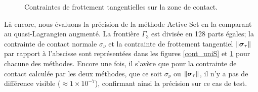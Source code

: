 \begin{figure}[ht!]
	\begin{center}
	\end{center}
	\caption{Contraintes de frottement tangentielles sur la zone de contact.}
	\label{cont_frotS}
\end{figure}
Là encore, nous évaluons la précision de la méthode Active Set en la comparant au quasi-Lagrangien augmenté. La frontière $\Gamma_3$ est divisée en 128 parts égales; la contrainte de contact normale $\sigma_{\nu}$ et la contrainte de frottement tangentiel $\|\mbox{\boldmath{$\sigma$}}_{\tau}\|$ par rapport à l'abscisse sont représentées dans les figures \ref{cont_uniS} et \ref{cont_frotS} pour chacune des méthodes. Encore une fois, il s'avère que pour la contrainte de contact calculée par les deux méthodes, que ce soit $\sigma_{\nu}$ ou $\|\mbox{\boldmath{$\sigma$}}_{\tau}\|$, il n'y a pas de différence visible ($\approx 1\times10^{-7}$), confirmant ainsi la précision sur ce cas de test.\\

